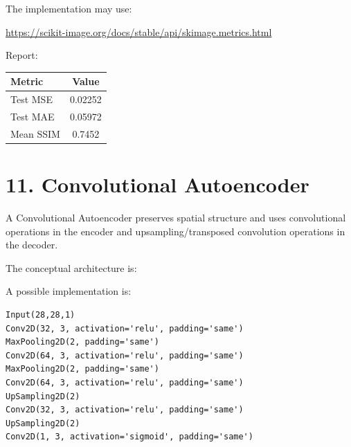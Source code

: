 \documentclass[10pt]{article}
\begin{document}
The implementation may use:

\url{https://scikit-image.org/docs/stable/api/skimage.metrics.html}

Report:

\begin{center}
\begin{tabular}{|l|c|}
\hline
Metric & Value\\
\hline
Test MSE & 0.02252\\
Test MAE & 0.05972\\
Mean SSIM & 0.7452\\
\hline
\end{tabular}
\end{center}

\section*{11. Convolutional Autoencoder}

A Convolutional Autoencoder preserves spatial structure and uses convolutional
operations in the encoder and upsampling/transposed convolution operations
in the decoder.

The conceptual architecture is:

\begin{center}
\end{center}

A possible implementation is:

\begin{verbatim}
Input(28,28,1)
Conv2D(32, 3, activation='relu', padding='same')
MaxPooling2D(2, padding='same')
Conv2D(64, 3, activation='relu', padding='same')
MaxPooling2D(2, padding='same')
Conv2D(64, 3, activation='relu', padding='same')
UpSampling2D(2)
Conv2D(32, 3, activation='relu', padding='same')
UpSampling2D(2)
Conv2D(1, 3, activation='sigmoid', padding='same')
\end{verbatim}
\end{document}
